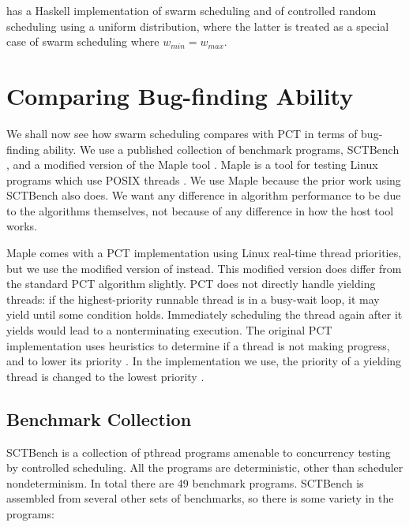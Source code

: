 \dejafu{} has a Haskell implementation of swarm scheduling and of
controlled random scheduling using a uniform distribution, where the
latter is treated as a special case of swarm scheduling where
$w_{min} = w_{max}$.

\section{Comparing Bug-finding Ability}
\label{sec:algorithms-bench}

We shall now see how swarm scheduling compares with PCT in terms of
bug-finding ability.  We use a published collection of benchmark
programs, SCTBench \parencite{thomson2016,thomson2014}, and a modified
version of the Maple tool \parencite{yu2012}.  Maple is a tool for testing
Linux programs which use POSIX threads \parencite{ieee1995}.  We use Maple
because the prior work using SCTBench also does.  We want any
difference in algorithm performance to be due to the algorithms
themselves, not because of any difference in how the host tool works.

Maple comes with a PCT implementation using Linux real-time thread priorities,
but we use the modified version of \cite{thomson2016} instead.  This modified
version does differ from the standard PCT algorithm slightly.  PCT does not
directly handle yielding threads: if the highest-priority runnable thread is in
a busy-wait loop, it may yield until some condition holds.  Immediately
scheduling the thread again after it yields would lead to a nonterminating
execution.  The original PCT implementation uses heuristics to determine if a
thread is not making progress, and to lower its priority \parencite{burckhardt2010}.
In the implementation we use, the priority of a yielding thread is changed to
the lowest priority \parencite{thomson2016}.

\subsection{Benchmark Collection}
\label{sec:algorithms-bench-sctbench}

SCTBench \parencite{thomson2016,thomson2014} is a collection of pthread
programs amenable to concurrency testing by controlled scheduling.
All the programs are deterministic, other than scheduler
nondeterminism.  In total there are 49 benchmark programs.  SCTBench
is assembled from several other sets of benchmarks, so there is some
variety in the programs:

